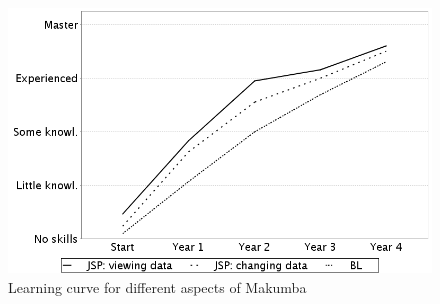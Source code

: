 \documentclass{chi2009}
\begin{document}

\begin{figure}[t]
  \label{fig:learning-technologies}
  \centering
  \includegraphics[width=0.47\columnwidth]{figures/learning-technologies}
  \caption{Learning curve for different aspects of Makumba}
\end{figure} 
\end{document}
